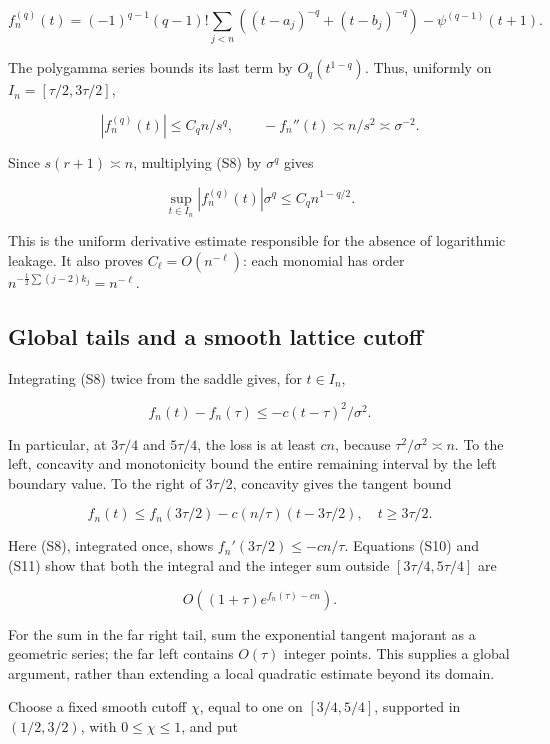 \[
 f_n^{(q)}(t)=(-1)^{q-1}(q-1)!
 \sum_{j<n}\left((t-a_j)^{-q}+(t-b_j)^{-q}\right)
 -\psi^{(q-1)}(t+1). \tag{S7}
\]

The polygamma series bounds its last term by \(O_q(t^{1-q})\). Thus,
uniformly on \(I_n=[\tau/2,3\tau/2]\),

\[
 |f_n^{(q)}(t)|\le C_q n/s^q,\qquad
 -f_n''(t)\asymp n/s^2\asymp\sigma^{-2}. \tag{S8}
\]

Since \(s(r+1)\asymp n\), multiplying (S8) by \(\sigma^q\) gives

\[
 \sup_{t\in I_n}|f_n^{(q)}(t)|\sigma^q
 \le C_q n^{1-q/2}. \tag{S9}
\]

This is the uniform derivative estimate responsible for the absence of
logarithmic leakage. It also proves \(C_\ell=O(n^{-\ell})\): each
monomial has order \(n^{-\frac12\sum(j-2)k_j}=n^{-\ell}\).

\subsection{Global tails and a smooth lattice
cutoff}\label{tcl:global-tails-and-a-smooth-lattice-cutoff}

Integrating (S8) twice from the saddle gives, for \(t\in I_n\),

\[
 f_n(t)-f_n(\tau)\le-c(t-\tau)^2/\sigma^2. \tag{S10}
\]

In particular, at \(3\tau/4\) and \(5\tau/4\), the loss is at least
\(c n\), because \(\tau^2/\sigma^2\asymp n\). To the left, concavity and
monotonicity bound the entire remaining interval by the left boundary
value. To the right of \(3\tau/2\), concavity gives the tangent bound

\[
 f_n(t)\le f_n(3\tau/2)-c(n/\tau)(t-3\tau/2),\quad t\ge3\tau/2. \tag{S11}
\]

Here (S8), integrated once, shows \(f_n'(3\tau/2)\le-cn/\tau\).
Equations (S10) and (S11) show that both the integral and the integer
sum outside \([3\tau/4,5\tau/4]\) are

\[
 O\left((1+\tau)e^{f_n(\tau)-cn}\right). \tag{S12}
\]

For the sum in the far right tail, sum the exponential tangent majorant
as a geometric series; the far left contains \(O(\tau)\) integer points.
This supplies a global argument, rather than extending a local quadratic
estimate beyond its domain.

Choose a fixed smooth cutoff \(\chi\), equal to one on \([3/4,5/4]\),
supported in \((1/2,3/2)\), with \(0\le\chi\le1\), and put

